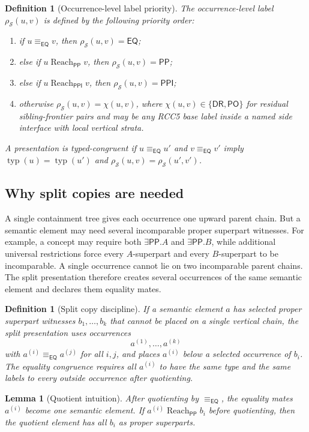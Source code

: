 \documentclass[11pt]{article}
\newtheorem{lemma}[theorem]{Lemma}
\newtheorem{definition}[theorem]{Definition}
\newcommand{\EQ}{\mathsf{EQ}}
\newcommand{\DR}{\mathsf{DR}}
\newcommand{\PO}{\mathsf{PO}}
\newcommand{\PP}{\mathsf{PP}}
\newcommand{\PPI}{\mathsf{PPI}}
\newcommand{\typ}{\operatorname{typ}}
\newcommand{\eqc}{\equiv_{\EQ}}
\newcommand{\reach}{\operatorname{Reach}}
\begin{document}
\begin{definition}[Occurrence-level label priority]\label{def:priority-label}
The occurrence-level label $\rho_\mathcal S(u,v)$ is defined by the following priority order:
\begin{enumerate}[label=(L\arabic*)]
\item if $u\eqc v$, then $\rho_\mathcal S(u,v)=\EQ$;
\item else if $u\reach_\PP v$, then $\rho_\mathcal S(u,v)=\PP$;
\item else if $u\reach_\PPI v$, then $\rho_\mathcal S(u,v)=\PPI$;
\item otherwise $\rho_\mathcal S(u,v)=\chi(u,v)$, where $\chi(u,v)\in\{\DR,\PO\}$ for residual sibling-frontier pairs and may be any RCC5 base label inside a named side interface with local vertical strata.
\end{enumerate}
A presentation is typed-congruent if $u\eqc u'$ and $v\eqc v'$ imply $\typ(u)=\typ(u')$ and $\rho_\mathcal S(u,v)=\rho_\mathcal S(u',v')$.
\end{definition}

\subsection{Why split copies are needed}

A single containment tree gives each occurrence one upward parent chain.  But a semantic element may need several incomparable proper superpart witnesses.  For example, a concept may require both $\exists\PP.A$ and $\exists\PP.B$, while additional universal restrictions force every $A$-superpart and every $B$-superpart to be incomparable.  A single occurrence cannot lie on two incomparable parent chains.  The split presentation therefore creates several occurrences of the same semantic element and declares them equality mates.

\begin{definition}[Split copy discipline]\label{def:split-copy}
If a semantic element $a$ has selected proper superpart witnesses $b_1,\ldots,b_k$ that cannot be placed on a single vertical chain, the split presentation uses occurrences
\[
  a^{(1)},\ldots,a^{(k)}
\]
with $a^{(i)}\eqc a^{(j)}$ for all $i,j$, and places $a^{(i)}$ below a selected occurrence of $b_i$.  The equality congruence requires all $a^{(i)}$ to have the same type and the same labels to every outside occurrence after quotienting.
\end{definition}

\begin{lemma}[Quotient intuition]\label{lem:split-copy-intuition}
After quotienting by $\eqc$, the equality mates $a^{(i)}$ become one semantic element.  If $a^{(i)}\reach_\PP b_i$ before quotienting, then the quotient element has all $b_i$ as proper superparts.
\end{lemma}
\end{document}
